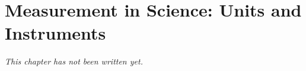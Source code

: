 \chapter{Measurement in Science: Units and Instruments}\label{ch:g6:measurement-in-science}


\emph{This chapter has not been written yet.}
